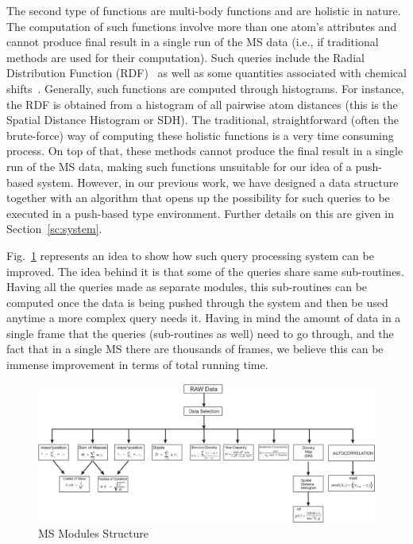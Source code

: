 \documentclass[10pt,journal,final,letterpaper,twocolumn]{IEEEtran}
\begin{document}
The second type of functions are multi-body functions and are
holistic in nature. The computation of such functions involve more
than one atom's attributes and cannot produce final result in a
single run of the MS data (i.e., if traditional methods are used for
their computation). Such queries include the Radial Distribution
Function (RDF)~\cite{bamdad06, Frenkel:api01, AstroAnalysis02} as
well as some quantities associated with chemical
shifts~\cite{ChemShift_BCB98}. Generally, such functions are
computed through histograms. For instance, the RDF is obtained from
a histogram of all pairwise atom distances (this is the Spatial
Distance Histogram or SDH). The traditional, straightforward (often
the brute-force) way of computing these holistic functions is a very
time consuming process. On top of that, these methods cannot produce
the final result in a single run of the MS data, making such
functions unsuitable for our idea of a push-based system. However,
in our previous work, we have designed a data structure together
with an algorithm that opens up the possibility for such queries to
be executed in a push-based type environment. Further details on
this are given in Section~\ref{sc:system}.

Fig.~\ref{fg:querynetwork} represents an idea to show how such query
processing system can be improved. The idea behind it is that some
of the queries share same sub-routines. Having all the queries made
as separate modules, this sub-routines can be computed once the data
is being pushed through the system and then be used anytime a more
complex query needs it. Having in mind the amount of data in a
single frame that the queries (sub-routines as well) need to go
through, and the fact that in a single MS there are thousands of
frames, we believe this can be immense improvement in terms of total
running time.

\begin{figure}
 \centerline{ \includegraphics[width=1\textwidth]{images/msstructure.eps} }
 \caption{MS Modules Structure}
 \label{fg:querynetwork}
\end{figure}
\end{document}
